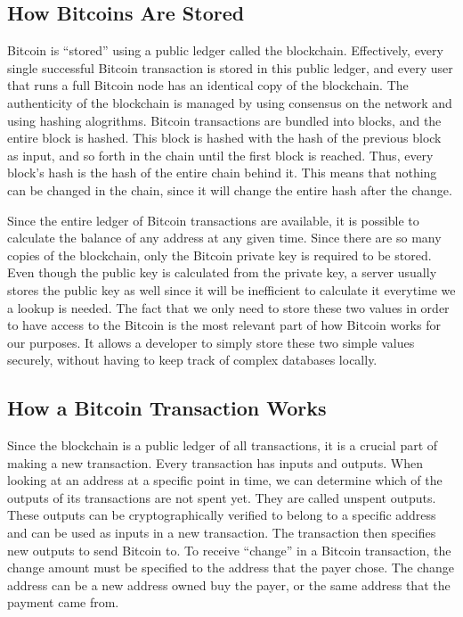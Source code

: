 \subsection{How Bitcoins Are Stored}
\label{sbs:bitcoin_stored}

Bitcoin is ``stored'' using a public ledger called the blockchain. Effectively, every single successful Bitcoin transaction is stored in this public ledger, and every user that runs a full Bitcoin node has an identical copy of the blockchain. The authenticity of the blockchain is managed by using consensus on the network and using hashing alogrithms. Bitcoin transactions are bundled into blocks, and the entire block is hashed. This block is hashed with the hash of the previous block as input, and so forth in the chain until the first block is reached. Thus, every block's hash is the hash of the entire chain behind it. This means that nothing can be changed in the chain, since it will change the entire hash after the change.

Since the entire ledger of Bitcoin transactions are available, it is possible to calculate the balance of any address at any given time. Since there are so many copies of the blockchain, only the Bitcoin private key is required to be stored. Even though the public key is calculated from the private key, a server usually stores the public key as well since it will be inefficient to calculate it everytime we a lookup is needed. The fact that we only need to store these two values in order to have access to the Bitcoin is the most relevant part of how Bitcoin works for our purposes. It allows a developer to simply store these two simple values securely, without having to keep track of complex databases locally.

\subsection{How a Bitcoin Transaction Works}

Since the blockchain is a public ledger of all transactions, it is a crucial part of making a new transaction. Every transaction has inputs and outputs. When looking at an address at a specific point in time, we can determine which of the outputs of its transactions are not spent yet. They are called unspent outputs. These outputs can be cryptographically verified to belong to a specific address and can be used as inputs in a new transaction. The transaction then specifies new outputs to send Bitcoin to. To receive ``change'' in a Bitcoin transaction, the change amount must be specified to the address that the payer chose. The change address can be a new address owned buy the payer, or the same address that the payment came from.

